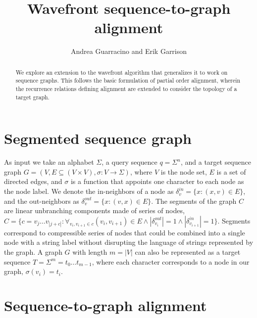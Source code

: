 \documentclass[10pt]{article}         %
\title{Wavefront sequence-to-graph alignment}
\author{Andrea Guarracino and Erik Garrison}
\begin{document}
\maketitle

\begin{abstract}
  We explore an extension to the wavefront algorithm that generalizes it to work on sequence graphs.
  This follows the basic formulation of partial order alignment, wherein the recurrence relations defining alignment are extended to consider the topology of a target graph.
\end{abstract}


\section{Segmented sequence graph}

As input we take an alphabet $\Sigma$, a query sequence $q = \Sigma^n$, and a target sequence graph $G = (V, E \subseteq (V \times V ), \sigma : V \rightarrow \Sigma)$, where $V$ is the node set, $E$ is a set of directed edges, and $\sigma$ is a function that appoints one character to each node as the node label.
We denote the in-neighbors of a node as $\delta_v^{in} = \{x : (x, v) \in E\}$, and the out-neighbors as $\delta_v^{out} = \{x : (v, x) \in E\}$.
The segments of the graph $C$ are linear unbranching components made of series of nodes, $C = \{c = v_j \ldots v_{|j+c|} : \forall_{v_i, v_{i+1} \in c} (v_i, v_{i+1}) \in E \land |\delta_{v_i}^{out}| = 1 \land |\delta_{v_{i+1}}^{in}| = 1 \}$.
Segments correspond to compressible series of nodes that could be combined into a single node with a string label without disrupting the language of strings represented by the graph.
A graph $G$ with length $m = |V|$ can also be represented as a target sequence $T = \Sigma^m = t_0\ldots t_{m-1}$, where each character corresponds to a node in our graph, $\sigma(v_i) = t_i$.

\section{Sequence-to-graph alignment}

\end{document}
